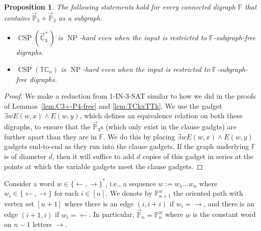 \documentclass{article}
\newtheorem{proposition}[theorem]{Proposition}
\theoremstyle{definition}
\theoremstyle{remark}
\DeclareMathOperator{\NP}{NP}
\DeclareMathOperator{\CSP}{CSP}
\newcommand{\bC}{{\mathbb C}}
\newcommand{\bF}{{\mathbb F}}
\newcommand{\bP}{{\mathbb P}}
\newcommand{\bT}{{\mathbb T}}
\begin{document}
\begin{proposition}\label{prop:P3+P3}
    The following statements hold for every connected digraph $\bF$ that contains
    $\vec{\bP}_3+\vec{\bP}_3$ as a subgraph.
    \begin{itemize}
        \item $\CSP(\vec{\bC}_3^+)$ is $\NP$-hard even when the input is restricted to
        $\bF$-subgraph-free digraphs.
        \item$\CSP(\bT\bC_n)$ is $\NP$-hard even when the input is restricted to
        $\bF$-subgraph-free digraphs.
    \end{itemize}
\end{proposition}
\begin{proof}
We make a reduction from 1-IN-3-SAT similar to how we did in the proofs of Lemmas~\ref{lem:C3+-P4-free} and \ref{lem:TCkxTTk}. We use the gadget $\exists w E(w,x) \wedge E(w,y)$, which defines an equivalence relation on both these digraphs, to ensure that the ${\vec \bP_3}$s (which only exist in the clause gadgts) are further apart than they are in $\bF$. We do this by placing $\exists w E(w,x) \wedge E(w,y)$ gadgets end-to-end as they run into the clause gadgets. If the graph underlying $\bF$ is of diameter $d$, then it will suffice to add $d$ copies of this gadget in series at the points at which the variable gadgets meet the clause gadgets.

\end{proof}

Consider a word $w\in\{\leftarrow,\rightarrow\}^\ast$, i.e., a sequence
$w:=w_1\dots w_n$ where $w_i\in\{\leftarrow,\rightarrow\}$ for each $i\in[n]$. We denote
by $\bP_{n+1}^w$ the oriented path with vertex set $[n+1]$ where there is an edge $(i,i+i)$
if $w_i = \rightarrow$, and there is an edge $(i+1,i)$ if $w_i = \leftarrow$. 
In particular, $\vec{\bP}_n = \bP_n^w$ where $w$ is the constant word on $n-1$ letters
$\rightarrow$.
\end{document}
